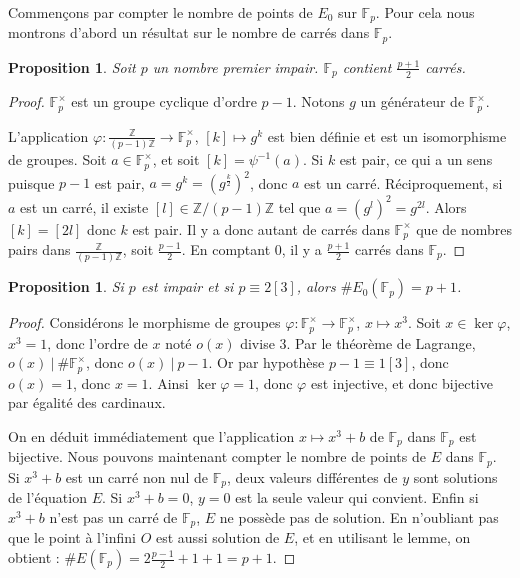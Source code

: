 \documentclass{article}
\theoremstyle{plain}%
\newtheorem{prop}[thm]{Proposition}
\theoremstyle{definition}%
\newcommand{\Fp}{\mathbb{F}_{p}}
\newcommand{\Z}{\mathbb{Z}}
\begin{document}
Commençons par compter le nombre de points de $E_0$ sur $\Fp$. Pour cela nous montrons d'abord un résultat sur le nombre de carrés dans $\Fp$.

\begin{prop}
  Soit $p$ un nombre premier impair. $\Fp$ contient $\frac{p+1}{2}$ carrés.
\end{prop}

\begin{proof}
  $\Fp^\times$ est un groupe cyclique d'ordre $p-1$. 
  Notons $g$ un générateur de $\Fp^\times$. 
  
  L'application $ \varphi \colon \frac{\Z}{(p-1)\Z} \to \Fp^\times$,
  $[k] \mapsto g^k$
  est bien définie et est un isomorphisme de groupes.
  Soit $a\in \Fp^\times$, et soit $[k] = \psi^{-1}(a)$.
  Si $k$ est pair, ce qui a un sens puisque $p-1$ est pair, $a = g^k = (g^\frac{k}{2})^2$, donc $a$ est un carré.
  Réciproquement, si $a$ est un carré, il existe $[l]\in \Z/(p-1)\Z$ tel que $a = (g^l)^2 = g^{2l}$.
  Alors $[k] = [2l]$ donc $k$ est pair.
  Il y a donc autant de carrés dans $\Fp^\times$ que de nombres pairs dans $\frac{\Z}{(p-1)\Z}$, soit $\frac{p-1}{2}$. 
  En comptant $0$, il y a $\frac{p+1}{2}$ carrés dans $\Fp$. 
\end{proof}

\begin{prop}
  Si $p$ est impair et si $p \equiv 2 [3]$, alors $\#E_0(\Fp) = p+1$.
\end{prop}

\begin{proof}
  Considérons le morphisme de groupes $\varphi \colon \Fp^\times \to \Fp^\times$, $x \mapsto x^3$. 
  Soit $x\in \ker \varphi$, $x^3 = 1$, donc l'ordre de $x$ noté $o(x)$ divise $3$. 
  Par le théorème de Lagrange, $o(x)\ |\ \#\Fp^\times$, donc $o(x)\ |\ p-1$. 
  Or par hypothèse $p-1\equiv 1[3]$, donc $o(x) = 1$, donc $x = 1$.
  Ainsi $\ker \varphi = {1}$, donc $\varphi$ est injective, et donc bijective par égalité des cardinaux.

  On en déduit immédiatement que l'application $x \mapsto x^3 + b$ de $\Fp$ dans $\Fp$ est bijective.
  Nous pouvons maintenant compter le nombre de points de $E$ dans $\Fp$. 
  Si $x^3 + b$ est un carré non nul de $\Fp$, deux valeurs différentes de $y$ sont solutions de l'équation $E$. 
  Si $x^3 + b = 0$, $y = 0$ est la seule valeur qui convient.
  Enfin si $x^3 + b$ n'est pas un carré de $\Fp$, $E$ ne possède pas de solution.
  En n'oubliant pas que le point à l'infini $O$ est aussi solution de $E$, et en utilisant le lemme, on obtient : $\#E(\Fp) = 2\frac{p-1}{2} + 1 + 1 = p+1$.
\end{proof}
\end{document}
